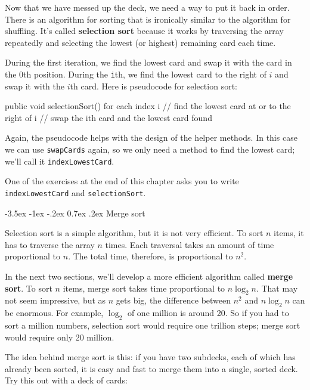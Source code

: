 \documentclass[12pt]{book}
\makeatletter
\theoremstyle{exercise}
\newcommand{\java}[1]{\verb"#1"}
\renewcommand{\section}{\@startsection{section}{1}{\z@}%
    {-3.5ex \@plus -1ex \@minus -.2ex}%
    {0.7ex \@plus.2ex}%
    {\normalfont\Large\bfseries}}
\newcommand{\java}[1]{\lstinline{#1}} %
\makeatother
\begin{document}
Now that we have messed up the deck, we need a way to put it back in order.
There is an algorithm for sorting that is ironically similar to the algorithm for shuffling.
It's called {\bf selection sort} because it works by traversing the array repeatedly and selecting the lowest (or highest) remaining card each time.

During the first iteration, we find the lowest card and swap it with the card in the 0th position.
During the \java{i}th, we find the lowest card to the right of $i$ and swap it with the $i$th card.
Here is pseudocode for selection sort:

\begin{code}
public void selectionSort() {
    for each index i {
        // find the lowest card at or to the right of i
        // swap the ith card and the lowest card found
    }
}
\end{code}


Again, the pseudocode helps with the design of the helper methods.
In this case we can use \java{swapCards} again, so we only need a method to find the lowest card; we'll call it \java{indexLowestCard}.

One of the exercises at the end of this chapter asks you to write \java{indexLowestCard} and \java{selectionSort}.



\section{Merge sort}
\label{mergesort}


Selection sort is a simple algorithm, but it is not very efficient.
To sort $n$ items, it has to traverse the array $n$ times.
Each traversal takes an amount of time proportional to $n$.
The total time, therefore, is proportional to $n^2$.

In the next two sections, we'll develop a more efficient algorithm called {\bf merge sort}.
To sort $n$ items, merge sort takes time proportional to $n \log_2 n$.
That may not seem impressive, but as $n$ gets big, the difference between $n^2$ and $n \log_2 n$ can be enormous.
For example, $\log_2$ of one million is around 20.
So if you had to sort a million numbers, selection sort would require one trillion steps; merge sort would require only 20 million.

The idea behind merge sort is this: if you have two subdecks, each of which has already been sorted, it is easy and fast to merge them into a single, sorted deck.
Try this out with a deck of cards:
\end{document}

